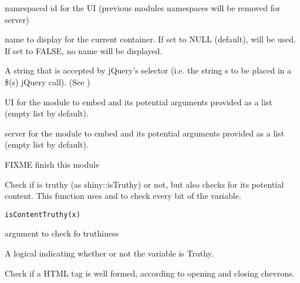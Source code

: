 \documentclass[letterpaper]{book}
\begin{document}
\begin{Arguments}
\begin{ldescription}
\item[\code{id}] namespaced id for the UI (previous modules namespaces will be
removed for server)

\item[\code{name}] name to display for the current container. If set to NULL (default),
 will be used. If set to FALSE, no name will be displayed.

\item[\code{selector}] A string that is accepted by jQuery's selector (i.e. the
string s to be placed in a \$(s) jQuery call). (See )

\item[\code{moduleUI, moduleUI.args}] UI for the module to embed and its potential
arguments provided as a list (empty list by default).

\item[\code{module, module.args}] server for the module to embed and its potential
arguments provided as a list (empty list by default).

FIXME finish this module
\end{ldescription}
\end{Arguments}
%
\begin{Description}\relax
Check if  is truthy (as shiny::isTruthy) or not, but also
checks for its potential content. This function uses  and  to
check every bit of the variable.
\end{Description}
%
\begin{Usage}
\begin{verbatim}
isContentTruthy(x)
\end{verbatim}
\end{Usage}
%
\begin{Arguments}
\begin{ldescription}
\item[\code{x}] argument to check fo truthiness
\end{ldescription}
\end{Arguments}
%
\begin{Value}
A logical indicating whether or not the variable is Truthy.
\end{Value}
%
\begin{Description}\relax
Check if a HTML tag is well formed, according to opening and closing chevrons.
\end{Description}
\end{document}
